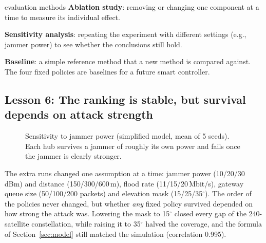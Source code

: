 \documentclass[11pt,a4paper]{article}
\newcommand{\kt}[1]{\textbf{\color{navy}#1}}
\begin{document}
\begin{term}{evaluation methods}
\kt{Ablation study}: removing or changing one component at a time to measure its individual effect.\par
\kt{Sensitivity analysis}: repeating the experiment with different settings (e.g., jammer power) to see whether the conclusions still hold.\par
\kt{Baseline}: a simple reference method that a new method is compared against. The four fixed policies are baselines for a future smart controller.
\end{term}

\subsection{Lesson 6: The ranking is stable, but survival depends on attack strength}

\begin{figure}[h]
\centering
{}
\caption{Sensitivity to jammer power (simplified model, mean of 5 seeds). Each hub survives a jammer of roughly its own power and fails once the jammer is clearly stronger.}\label{fig:sens}
\end{figure}

The extra runs changed one assumption at a time: jammer power (10/20/30\,dBm) and distance (150/300/600\,m), flood rate (11/15/20\,Mbit/s), gateway queue size (50/100/200 packets) and elevation mask (15/25/35$^\circ$). The order of the policies never changed, but whether \emph{any} fixed policy survived depended on how strong the attack was. Lowering the mask to 15$^\circ$ closed every gap of the 240-satellite constellation, while raising it to 35$^\circ$ halved the coverage, and the formula of Section~\ref{sec:model} still matched the simulation (correlation 0.995).
\end{document}

